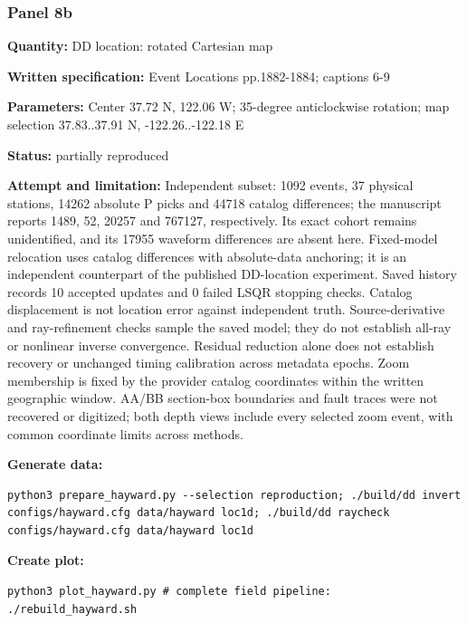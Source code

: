 \subsubsection*{Panel 8b}
\noindent\textbf{Quantity:} DD location: rotated Cartesian map\par
\noindent\textbf{Written specification:} Event Locations pp.1882-1884; captions 6-9\par
\noindent\textbf{Parameters:} Center 37.72 N, 122.06 W; 35-degree anticlockwise rotation; map selection 37.83..37.91 N, -122.26..-122.18 E\par
\noindent\textbf{Status:} partially reproduced\par
\noindent\textbf{Attempt and limitation:} Independent subset: 1092 events, 37 physical stations, 14262 absolute P picks and 44718 catalog differences; the manuscript reports 1489, 52, 20257 and 767127, respectively. Its exact cohort remains unidentified, and its 17955 waveform differences are absent here. Fixed-model relocation uses catalog differences with absolute-data anchoring; it is an independent counterpart of the published DD-location experiment. Saved history records 10 accepted updates and 0 failed LSQR stopping checks. Catalog displacement is not location error against independent truth. Source-derivative and ray-refinement checks sample the saved model; they do not establish all-ray or nonlinear inverse convergence. Residual reduction alone does not establish recovery or unchanged timing calibration across metadata epochs. Zoom membership is fixed by the provider catalog coordinates within the written geographic window. AA/BB section-box boundaries and fault traces were not recovered or digitized; both depth views include every selected zoom event, with common coordinate limits across methods.\par
\noindent\textbf{Generate data:}
\begin{lstlisting}
python3 prepare_hayward.py --selection reproduction; ./build/dd invert configs/hayward.cfg data/hayward loc1d; ./build/dd raycheck configs/hayward.cfg data/hayward loc1d
\end{lstlisting}
\noindent\textbf{Create plot:}
\begin{lstlisting}
python3 plot_hayward.py # complete field pipeline: ./rebuild_hayward.sh
\end{lstlisting}
